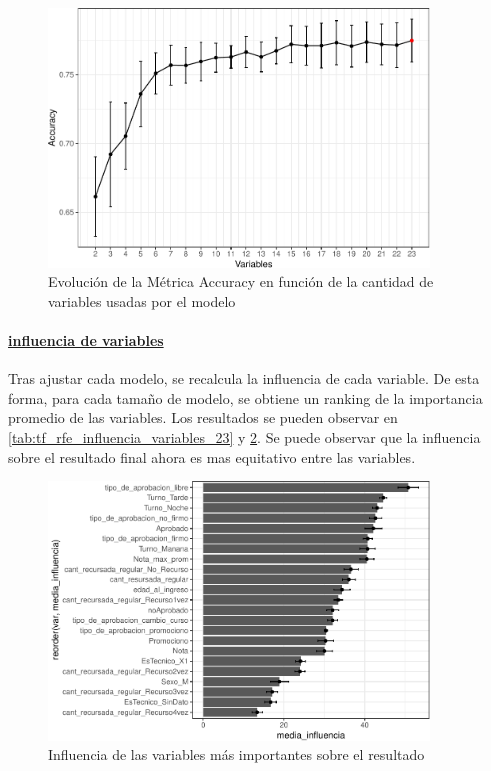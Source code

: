 \begin{figure}[!htb]
	\centering
	\includegraphics[width=0.9\textwidth]{imagenes/variables/rfe_evolucion_accuracy-1_alternativa2.pdf}
	\caption{Evolución de la Métrica Accuracy en función de la cantidad de variables usadas por el modelo}
	\label{fig:rfe_evolucion_accuracy_datasetAlternativa2}
\end{figure}

\paragraph{\underline{influencia de variables}}
Tras ajustar cada modelo, se recalcula la influencia de cada variable.
De esta forma, para cada tamaño de modelo, se obtiene un ranking de la
importancia promedio de las variables. Los resultados se pueden observar en \ref{tab:tf_rfe_influencia_variables_23} y \ref{fig:rfe_influencia_var_dsalternativa2}. Se puede observar que la influencia sobre el resultado final ahora es mas equitativo entre las variables.


\begin{figure}[!htb]
	\centering
	\includegraphics[width=0.9\textwidth]{imagenes/variables/influencia_de_variables_23-1.pdf}
	\caption{Influencia de las variables más importantes sobre el resultado}
	\label{fig:rfe_influencia_var_dsalternativa2}
\end{figure}

